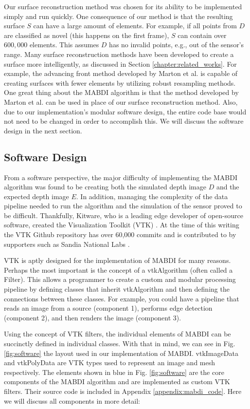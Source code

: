 Our surface reconstruction method was chosen for its ability to be implemented
simply and run quickly. One consequence of our method is that the resulting
surface $S$ can have a large amount of elements. For example, if all points from
$D$ are classified as novel (this happens on the first frame), $S$ can contain
over $600,000$ elements. This assumes $D$ has no invalid points, e.g., out of
the sensor's range. Many surface reconstruction methods have been developed to
create a surface more intelligently, as discussed in Section
\ref{chapter:related_works}. For example, the advancing front method developed
by Marton et al. \cite{Marton2009} is capable of creating surfaces with fewer
elements by utilizing robust resampling methods. One great thing about the MABDI
algorithm is that the method developed by Marton et al. can be used in place of
our surface reconstruction method. Also, due to our implementation's modular
software design, the entire code base would not need to be changed in order to
accomplish this. We will discuss the software design in the next section.

\subsection{Software Design}

From a software perspective, the major difficulty of implementing the MABDI
algorithm was found to be creating both the simulated depth image $D$ and the
expected depth image $E$. In addition, managing the complexity of the data
pipeline needed to run the algorithm and the simulation of the sensor proved to
be difficult. Thankfully, Kitware, who is a leading edge developer of
open-source software, created the Visualization Toolkit (VTK)
\cite{schroeder2004visualization, sitevtk}. At the time of this writing the VTK
Github repository has over 60,000 commits and is contributed to by supporters
such as Sandia National Labs \cite{sitesandia}.

VTK is aptly designed for the implementation of MABDI for many reasons. Perhaps
the most important is the concept of a vtkAlgorithm (often called a Filter).
This allows a programmer to create a custom and modular processing pipeline by
defining classes that inherit vtkAlgorithm and then defining the connections
between these classes. For example, you could have a pipeline that reads an
image from a source (component 1), performs edge detection (component 2), and
then renders the image (component 3).

Using the concept of VTK filters, the individual elements of MABDI can be
succinctly defined in individual classes. With that in mind, we can see in Fig.
\ref{fig:software} the layout used in our implementation of MABDI. vtkImageData
and vtkPolyData are VTK types used to represent an image and mesh respectively.
The elements shown in blue in Fig. \ref{fig:software} are the core components of
the MABDI algorithm and are implemented as custom VTK filters. Their source code
is included in Appendix \ref{appendix:mabdi_code}. Here we will discuss all
components in more detail:

